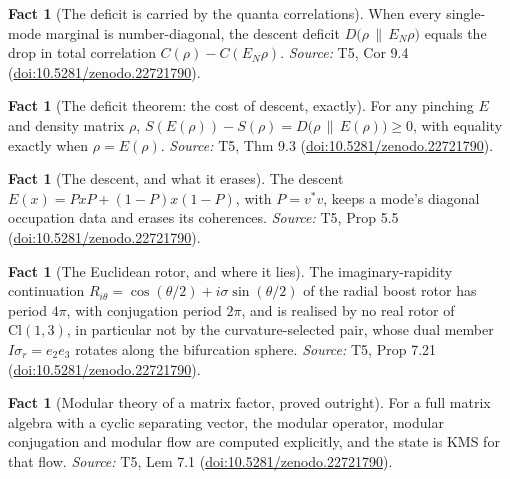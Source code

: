 \documentclass[11pt]{article}
\theoremstyle{definition}
\newtheorem{fact}[theorem]{Fact}
\theoremstyle{plain}
\providecommand{\Cl}{}\renewcommand{\Cl}{\mathrm{Cl}}
\providecommand{\EN}{}\renewcommand{\EN}{E_{N}}
\providecommand{\rel}{}\renewcommand{\rel}[2]{D\bigl(#1 \,\|\, #2\bigr)}
\begin{document}
\begin{fact}[The deficit is carried by the quanta correlations]\label{c:singularity.deficit-carried-quanta-correlations}
When every single-mode marginal is number-diagonal, the descent deficit $\rel{\rho}{\EN\rho}$ equals the drop in total correlation $C(\rho) - C(\EN\rho)$.
\emph{Source:} T5, Cor 9.4 (\href{https://doi.org/10.5281/zenodo.22721790}{doi:10.5281/zenodo.22721790}).
\end{fact}

\begin{fact}[The deficit theorem: the cost of descent, exactly]\label{c:singularity.deficit-theorem-cost-descent-exactly}
For any pinching $E$ and density matrix $\rho$, $S(E(\rho)) - S(\rho) = \rel{\rho}{E(\rho)} \geq 0$, with equality exactly when $\rho = E(\rho)$.
\emph{Source:} T5, Thm 9.3 (\href{https://doi.org/10.5281/zenodo.22721790}{doi:10.5281/zenodo.22721790}).
\end{fact}

\begin{fact}[The descent, and what it erases]\label{c:singularity.descent-what-it-erases}
The descent $E(x) = PxP + (1-P)x(1-P)$, with $P = v^* v$, keeps a mode's diagonal occupation data and erases its coherences.
\emph{Source:} T5, Prop 5.5 (\href{https://doi.org/10.5281/zenodo.22721790}{doi:10.5281/zenodo.22721790}).
\end{fact}

\begin{fact}[The Euclidean rotor, and where it lies]\label{c:singularity.euclidean-rotor-where-it-lies}
The imaginary-rapidity continuation $R_{i\theta} = \cos(\theta/2) + i\sigma\sin(\theta/2)$ of the radial boost rotor has period $4\pi$, with conjugation period $2\pi$, and is realised by no real rotor of $\Cl(1,3)$, in particular not by the curvature-selected pair, whose dual member $I\sigma_r = e_2e_3$ rotates along the bifurcation sphere.
\emph{Source:} T5, Prop 7.21 (\href{https://doi.org/10.5281/zenodo.22721790}{doi:10.5281/zenodo.22721790}).
\end{fact}

\begin{fact}[Modular theory of a matrix factor, proved outright]\label{c:singularity.modular-theory-matrix-factor-proved-outright}
For a full matrix algebra with a cyclic separating vector, the modular operator, modular conjugation and modular flow are computed explicitly, and the state is KMS for that flow.
\emph{Source:} T5, Lem 7.1 (\href{https://doi.org/10.5281/zenodo.22721790}{doi:10.5281/zenodo.22721790}).
\end{fact}
\end{document}
